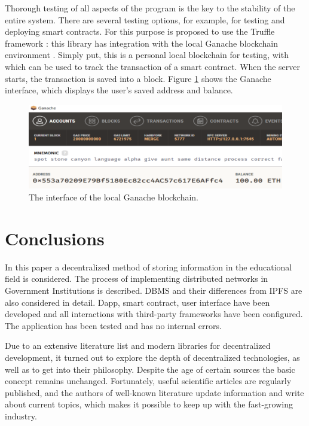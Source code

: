 \documentclass[10pt,conference,a4paper]{IEEEtran_EDM}
\begin{document}
Thorough testing of all aspects of the program is the key to the stability of the entire system.
There are several testing options, for example, for testing and deploying smart contracts.
For this purpose is proposed to use the Truffle framework \cite{Truffle}: this library has integration with the local Ganache blockchain environment \cite{Ganache}.
Simply put, this is a personal local blockchain for testing, with which can be used to track the transaction of a smart contract.
When the server starts, the transaction is saved into a block.
Figure \ref{GanacheB} shows the Ganache interface, which displays the user's saved address and balance.

\begin{figure}[htbp]
\centerline{\includegraphics[scale=0.51]{fig3.png}}
\caption{The interface of the local Ganache blockchain.}
\label{GanacheB}
\end{figure}

\section{Conclusions }
In this paper a decentralized method of storing information in the educational field is considered.
The process of implementing distributed networks in Government Institutions is described.
DBMS and their differences from IPFS are also considered in detail.
Dapp, smart contract, user interface have been developed and all interactions with third-party frameworks have been configured.
The application has been tested and has no internal errors.

Due to an extensive literature list and modern libraries for decentralized development, it turned out to explore the depth of decentralized technologies, as well as to get into their philosophy.
Despite the age of certain sources the basic concept remains unchanged.
Fortunately, useful scientific articles are regularly published, and the authors of well-known literature update information and write about current topics, which makes it possible to keep up with the fast-growing industry.
\end{document}
